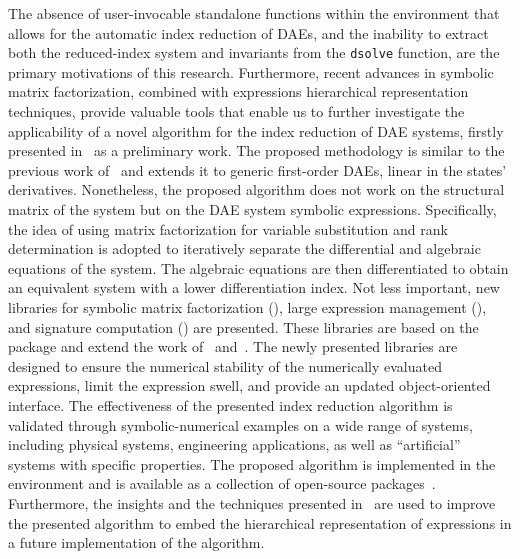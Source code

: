 The absence of user-invocable standalone functions within the \Maple{} environment that allows for the automatic index reduction of \acp{DAE}, and the inability to extract both the reduced-index system and invariants from the \texttt{dsolve} function, are the primary motivations of this research. Furthermore, recent advances in symbolic matrix factorization, combined with expressions hierarchical representation techniques, provide valuable tools that enable us to further investigate the applicability of a novel algorithm for the index reduction of \ac{DAE} systems, firstly presented in~\cite{stocco2024symbolic} as a preliminary work. The proposed methodology is similar to the previous work of~\citet{chowdhry2004symbolic} and extends it to generic first-order \acp{DAE}, linear in the states' derivatives. Nonetheless, the proposed algorithm does not work on the structural matrix of the system but on the \ac{DAE} system symbolic expressions. Specifically, the idea of using matrix factorization for variable substitution and rank determination is adopted to iteratively separate the differential and algebraic equations of the system. The algebraic equations are then differentiated to obtain an equivalent system with a lower differentiation index. Not less important, new libraries for symbolic matrix factorization (\LAST{}), large expression management (\LEM{}), and signature computation (\SIG{}) are presented. These libraries are based on the \LULEM{} package and extend the work of~\citet{zhou2006hierarchical, carette2006linear} and~\citet{zhou2007symbolic}. The newly presented libraries are designed to ensure the numerical stability of the numerically evaluated expressions, limit the expression swell, and provide an updated object-oriented interface. The effectiveness of the presented index reduction algorithm is validated through symbolic-numerical examples on a wide range of systems, including physical systems, engineering applications, as well as ``artificial'' systems with specific properties. The proposed algorithm is implemented in the \Maple{} environment and is available as a collection of open-source packages~\cite{last2023source,lem}. Furthermore, the insights and the techniques presented in~\cite{zhou2006hierarchical, carette2006linear, zhou2007symbolic} are used to improve the presented algorithm to embed the hierarchical representation of expressions in a future implementation of the algorithm.

